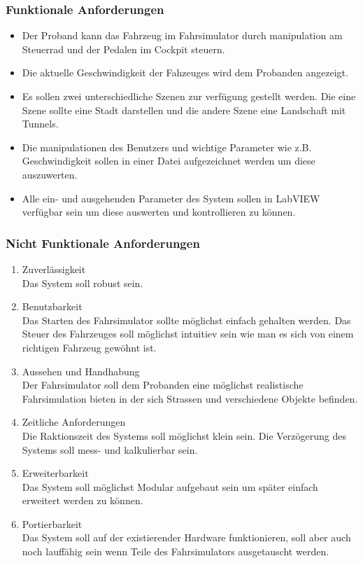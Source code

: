 \subsubsection{Funktionale Anforderungen}
\begin{itemize}
\item Der Proband kann das Fahrzeug im Fahrsimulator durch manipulation am Steuerrad und der Pedalen im Cockpit steuern.
\item Die aktuelle Geschwindigkeit der Fahzeuges wird dem Probanden angezeigt.
\item Es sollen zwei unterschiedliche Szenen zur verfügung gestellt werden.  Die eine Szene sollte eine Stadt darstellen und die andere Szene eine Landschaft mit Tunnels.
\item Die manipulationen des Benutzers und wichtige Parameter wie z.B. Geschwindigkeit sollen in einer Datei aufgezeichnet werden um diese auszuwerten.
\item Alle ein- und ausgehenden Parameter des System sollen in LabVIEW verfügbar sein um diese auswerten und kontrollieren zu können. 
\end{itemize}
\subsubsection {Nicht Funktionale Anforderungen}
\renewcommand{\labelenumi}{\alph{enumi})}
\begin{enumerate}
\item Zuverlässigkeit\\
Das System soll robust sein. 
\item Benutzbarkeit\\
Das Starten des Fahrsimulator sollte möglichst einfach gehalten werden. Das Steuer des Fahrzeuges soll möglichst intuitiev sein wie man es sich von einem richtigen Fahrzeug gewöhnt ist. 
\item Aussehen und Handhabung\\
Der Fahrsimulator soll dem Probanden eine möglichst realistische Fahrsimulation bieten in der sich Strassen und verschiedene Objekte befinden.
\item Zeitliche Anforderungen\\
Die Raktionszeit des Systems soll möglichst klein sein. Die Verzögerung des Systems soll mess-  und kalkulierbar sein.
\item Erweiterbarkeit\\
Das System soll möglichst Modular aufgebaut sein um später einfach erweitert werden zu können.
\item Portierbarkeit\\
Das System soll auf der existierender Hardware funktionieren, soll aber auch noch lauffähig sein wenn Teile des Fahrsimulators ausgetauscht werden. 
\end{enumerate}
